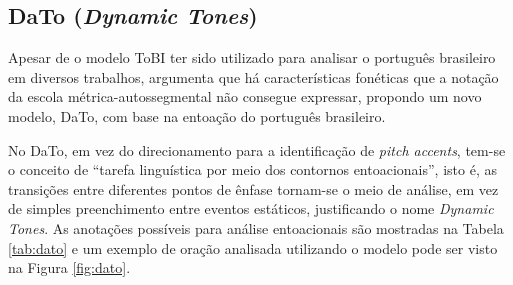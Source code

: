 \subsection{DaTo (\emph{Dynamic Tones})}
Apesar de o modelo ToBI ter sido utilizado para analisar o português brasileiro
em diversos trabalhos,  argumenta que há características
fonéticas que a notação da escola métrica-autossegmental não consegue expressar,
propondo um novo modelo, DaTo, com base na entoação do português brasileiro.

No DaTo, em vez do direcionamento para a identificação de \emph{pitch accents},
tem-se o conceito de ``tarefa linguística por meio dos contornos entoacionais'',
isto é, as transições entre diferentes pontos de ênfase tornam-se o meio de
análise, em vez de simples preenchimento entre eventos estáticos, justificando o
nome \emph{\emph{Dynamic} Tones}. As anotações possíveis para análise
entoacionais são mostradas na Tabela \ref{tab:dato} e um exemplo de oração
analisada utilizando o modelo pode ser visto na Figura \ref{fig:dato}.

